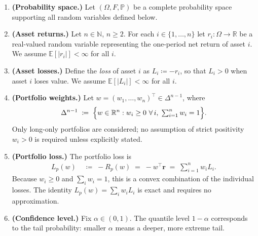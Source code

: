 \documentclass[12pt,openany]{book}
\newcommand{\Prob}{\mathbb{P}}
\newcommand{\bfw}{\mathbf{w}}
\numberwithin{equation}{chapter}
\theoremstyle{plain}
\theoremstyle{definition}
\theoremstyle{remark}
\def\mathcal#1{#1}%
\def\bfw{w}%
\begin{document}
\begin{enumerate}[label=\textbf{A\arabic*.}, leftmargin=*, widest=A9]

  \item \textbf{(Probability space.)}
        Let $(\Omega,\mathcal{F},\Prob)$ be a complete probability
        space supporting all random variables defined below.

  \item \textbf{(Asset returns.)}
        Let $n \in \mathbb{N}$, $n \geq 2$.
        For each $i \in \{1,\ldots,n\}$ let $r_i : \Omega \to
        \mathbb{R}$ be a real-valued random variable representing
        the one-period net return of asset $i$.  We assume
        $\mathbb{E}[|r_i|] < \infty$ for all $i$.

  \item \textbf{(Asset losses.)}
        Define the \emph{loss} of asset $i$ as
        $L_i \coloneqq -r_i$, so that $L_i > 0$ when
        asset $i$ loses value.  We assume $\mathbb{E}[|L_i|]
        < \infty$ for all $i$.

  \item \textbf{(Portfolio weights.)}
        Let $\bfw = (w_1,\ldots,w_n)^\top \in \Delta^{n-1}$, where
        \begin{equation}
          \Delta^{n-1}
          \;\coloneqq\;
          \Bigl\{\bfw \in \mathbb{R}^n :
            w_i \geq 0\ \forall\,i,\;
            \textstyle\sum_{i=1}^n w_i = 1
          \Bigr\}.
          \label{eq:simplex-def}
        \end{equation}
        Only long-only portfolios are considered; no assumption of
        strict positivity $w_i > 0$ is required unless explicitly
        stated.

  \item \textbf{(Portfolio loss.)}
        The portfolio loss is
        \begin{align}
          L_p(\bfw)
          &\;\coloneqq\; -R_p(\bfw)
          \;=\; -\bfw^\top \mathbf{r}
          \;=\; \sum_{i=1}^n w_i L_i.
          \label{eq:portfolio-loss-def}
        \end{align}
        Because $w_i \geq 0$ and $\sum_i w_i = 1$, this is a
        convex combination of the individual losses.  The identity
        $L_p(\bfw) = \sum_i w_i L_i$ is exact and requires no
        approximation.

  \item \textbf{(Confidence level.)}
        Fix $\alpha \in (0,1)$.  The quantile level $1-\alpha$
        corresponds to the tail probability: smaller $\alpha$ means
        a deeper, more extreme tail.


\end{enumerate}
\end{document}
